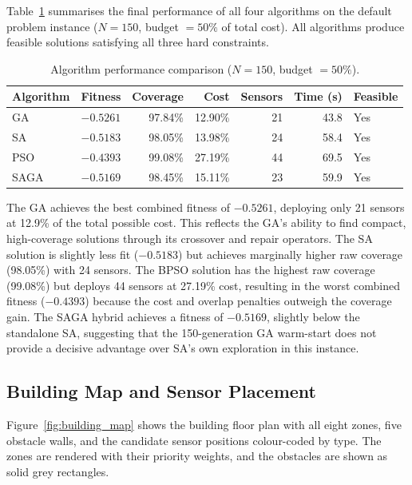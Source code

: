 \documentclass[12pt,a4paper]{article}
\begin{document}
Table~\ref{tab:results} summarises the final performance of all four algorithms on the default problem instance ($N = 150$, budget $= 50\%$ of total cost).
All algorithms produce feasible solutions satisfying all three hard constraints.

\begin{table}[H]
  \centering
  \caption{Algorithm performance comparison ($N=150$, budget $= 50\%$).}
  \label{tab:results}
  \begin{tabular}{lrrrrrl}
    \toprule
    \textbf{Algorithm} & \textbf{Fitness} & \textbf{Coverage} & \textbf{Cost} & \textbf{Sensors} & \textbf{Time (s)} & \textbf{Feasible} \\
    \midrule
    GA   & $-0.5261$ & 97.84\% & 12.90\% & 21 & 43.8  & Yes \\
    SA   & $-0.5183$ & 98.05\% & 13.98\% & 24 & 58.4  & Yes \\
    PSO  & $-0.4393$ & 99.08\% & 27.19\% & 44 & 69.5  & Yes \\
    SAGA & $-0.5169$ & 98.45\% & 15.11\% & 23 & 59.9  & Yes \\
    \bottomrule
  \end{tabular}
\end{table}

The GA achieves the best combined fitness of $-0.5261$, deploying only 21 sensors at 12.9\% of the total possible cost.
This reflects the GA's ability to find compact, high-coverage solutions through its crossover and repair operators.
The SA solution is slightly less fit ($-0.5183$) but achieves marginally higher raw coverage (98.05\%) with 24 sensors.
The BPSO solution has the highest raw coverage (99.08\%) but deploys 44 sensors at 27.19\% cost, resulting in the worst combined fitness ($-0.4393$) because the cost and overlap penalties outweigh the coverage gain.
The SAGA hybrid achieves a fitness of $-0.5169$, slightly below the standalone SA, suggesting that the 150-generation GA warm-start does not provide a decisive advantage over SA's own exploration in this instance.

\subsection{Building Map and Sensor Placement}

Figure~\ref{fig:building_map} shows the building floor plan with all eight zones, five obstacle walls, and the candidate sensor positions colour-coded by type.
The zones are rendered with their priority weights, and the obstacles are shown as solid grey rectangles.
\end{document}
